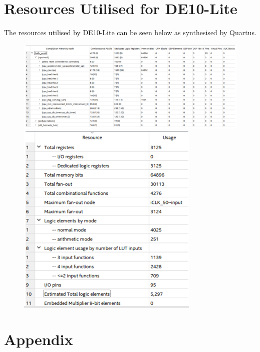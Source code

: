 \documentclass[12pt,a4paper]{article}
\begin{document}
\section{\small Resources Utilised for DE10-Lite}

{\scriptsize The resources utilised by DE10-Lite can be seen below as synthesised by Quartus.}
\par
\begin{figure} [h!]
    \includegraphics[scale = 0.8]{Res1.png}
    \includegraphics[scale = 0.6]{Res2.PNG}
\end{figure}

\newpage
\section{\small Appendix}
\end{document}

